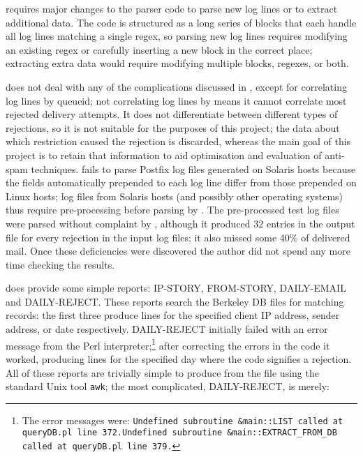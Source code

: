  requires major changes to the parser code to parse new log lines
or to extract additional data.  The code is structured as a long series of
blocks that each handle all log lines matching a single regex, so parsing
new log lines requires modifying an existing regex or carefully inserting a
new block in the correct place; extracting extra data would require
modifying multiple blocks, regexes, or both.

 does not deal with any of the complications discussed in
, except for correlating log lines by queueid;
not correlating log lines by  means it cannot correlate most
rejected delivery attempts.  It does not differentiate between different
types of rejections, so it is not suitable for the purposes of this
project; the data about which restriction caused the rejection is
discarded, whereas the main goal of this project is to retain that
information to aid optimisation and evaluation of anti-spam techniques.
 fails to parse Postfix log files generated on Solaris hosts
because the fields automatically prepended to each log line differ from
those prepended on Linux hosts; log files from Solaris hosts (and possibly
other operating systems) thus require pre-processing before parsing by
.  The \numberOFlogFILES{} pre-processed test log files were
parsed without complaint by , although it produced 32 entries
in the output  file for every rejection in the input log
files; it also missed some 40\% of delivered mail.  Once these deficiencies
were discovered the author did not spend any more time checking the
results.

 does provide some simple reports: IP-STORY, FROM-STORY,
DAILY-EMAIL and DAILY-REJECT\@.  These reports search the Berkeley DB files
for matching records: the first three produce  lines for the
specified client IP address, sender address, or date respectively.
DAILY-REJECT initially failed with an error message from the Perl
interpreter;\footnote{The error messages were: \newline{}\texttt{Undefined
subroutine \&main::LIST called at queryDB.pl line
372.}\newline{}\texttt{Undefined subroutine \&main::EXTRACT\_FROM\_DB
called at queryDB.pl line 379.}} after correcting the errors in the code it
worked, producing  lines for the specified day where the
 code signifies a rejection.  All of these reports are
trivially simple to produce from the  file using the standard
Unix tool \texttt{awk}; the most complicated, DAILY-REJECT, is
merely:

